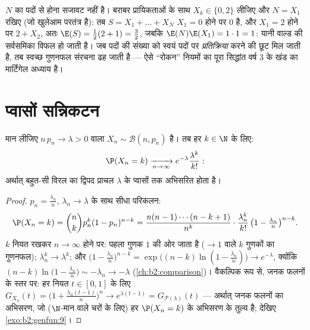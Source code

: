 \begin{remark}
$N$ का पदों से  होना सजावट नहीं है। बराबर प्रायिकताओं के
साथ $X_k \in \{0, 2\}$ लीजिए और $N =
X_1$ रखिए (जो खुलेआम परतंत्र है): तब $S = X_1 + \dots + X_N$ $X_1 = 0$ होने
पर $0$ है, और $X_1 = 2$ होने पर $2 + X_2$, अतः $\E(S) =
\frac12(2 + 1) = \frac32$, जबकि $\E(N)\E(X_1) = 1\cdot1 =
1$: यानी वाल्ड की
सर्वसमिका विफल हो जाती है। जब पदों की संख्या को स्वयं पदों पर
\emph{प्रतिक्रिया} करने की छूट मिल जाती है, तब स्वच्छ गुणनफल संरचना
ढह जाती है --- ऐसे ``रोकन'' नियमों का पूरा सिद्धांत वर्ष 3 के खंड
का मार्टिंगेल अध्याय है।
\end{remark}

\section{प्वासों सन्निकटन}

\begin{theorem}[विरल घटनाओं का नियम]\label{thm:b2:genfun:rareevents}
मान लीजिए $n\,p_n \to \lambda > 0$ वाला $X_n \sim \mathcal{B}(n, p_n)$ है। तब हर $k \in \N$ के लिए:
\[
\P(X_n = k)
\xrightarrow[n\to\infty]{}
e^{-\lambda}\frac{\lambda^k}{k!} :
\]
अर्थात् बहुत-सी विरल   का द्विपद  प्राचल $\lambda$ के
प्वासों  तक अभिसरित होता है।
\end{theorem}

\begin{proof}
$p_n = \frac{\lambda_n}{n}$, $\lambda_n
\to \lambda$ के साथ सीधा परिकलन:
\[
\P(X_n = k)
= \binom nk p_n^k(1 - p_n)^{n-k}
= \frac{n(n-1)\cdots(n-k+1)}{n^k}\cdot
\frac{\lambda_n^k}{k!}\,
\bigl(1 - \tfrac{\lambda_n}{n}\bigr)^{n-k} .
\]
$k$ नियत रखकर $n \to \infty$ होने पर: पहला गुणक $1$ की ओर जाता है ($\to 1$ वाले
$k$ गुणकों का गुणनफल); $\lambda_n^k \to \lambda^k$; और $\bigl(1 - \frac{\lambda_n}{n}\bigr)^{n-k} =
\exp\bigl((n-k)\ln(1 - \frac{\lambda_n}{n})\bigr) \to
e^{-\lambda}$, क्योंकि $(n - k)\ln\bigl(1 - \frac{\lambda_n}{n}\bigr)
\sim -\lambda_n \to -\lambda$ (\cref{ch:b2:comparison})।
वैकल्पिक रूप से, जनक फलनों के स्तर पर: हर नियत $t \in [0, 1]$ के लिए $G_{X_n}(t) = \bigl(1 +
\frac{\lambda_n(t-1)}{n}\bigr)^n \to e^{\lambda(t - 1)} =
G_{\mathcal{P}(\lambda)}(t)$ ---
अर्थात् जनक फलनों का अभिसरण, जो ($\N$-मान वाले चरों के लिए) हर
$\P(X_n = k)$ के अभिसरण के तुल्य है; देखिए \cref{exo:b2:genfun:9}।
\end{proof}

